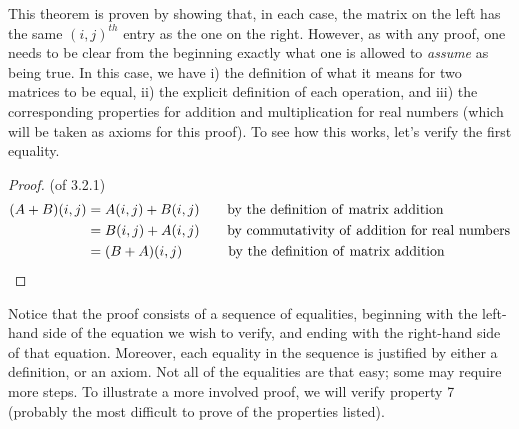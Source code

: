 \documentclass[11pt,notitlepage]{article}
\numberwithin{equation}{section}
\theoremstyle{plain}
\theoremstyle{definition}
\begin{document}
This theorem is proven by showing that, in each case, the matrix on the left has the same $(i,j)^{th}$ entry as the one on the right. However, as with any proof, one needs to be clear from the beginning exactly what one is allowed to {\it assume} as being true. In this case, we have i) the definition of what it means for two matrices to be equal, ii) the explicit definition of each operation, and iii) the corresponding properties for addition and multiplication for real numbers (which will be taken as axioms for this proof). To see how this works, let's verify the first equality. 

\begin{proof} (of 3.2.1)
\begin{align*}
(A+B)(i,j) &= A(i,j) + B(i,j)\qquad{\rm by\ the\ definition\ of\ matrix\ addition}\\
                &= B(i,j) + A(i,j)\qquad{\rm by\ commutativity\ of\ addition\ for\ real\ numbers}\\
               &= (B+A)(i,j)\qquad\quad\ {\rm by\ the\ definition\ of\ matrix\ addition}
\end{align*}
\end{proof}

Notice that the proof consists of a sequence of equalities, beginning with the left-hand side of the equation we wish to verify, and ending with the right-hand side of that equation. Moreover, each equality in the sequence is justified by either a definition, or an axiom. Not all of the equalities are that easy; some may require more steps. To illustrate a more involved proof, we will verify property 7 (probably the most difficult to prove of the properties listed).
\end{document}
